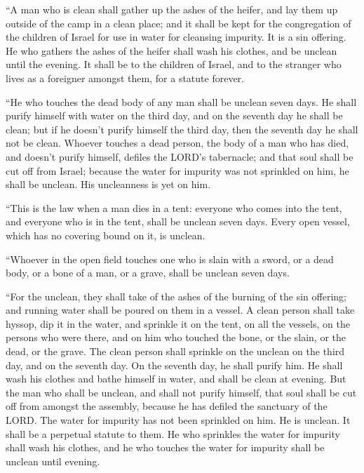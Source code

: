  ``A man who is clean shall gather up the ashes of the
heifer, and lay them up outside of the camp in a clean place; and it
shall be kept for the congregation of the children of Israel for use in
water for cleansing impurity. It is a sin offering.  He
who gathers the ashes of the heifer shall wash his clothes, and be
unclean until the evening. It shall be to the children of Israel, and to
the stranger who lives as a foreigner amongst them, for a statute
forever.

 ``He who touches the dead body of any man shall be
unclean seven days.  He shall purify himself with water
on the third day, and on the seventh day he shall be clean; but if he
doesn't purify himself the third day, then the seventh day he shall not
be clean.  Whoever touches a dead person, the body of a
man who has died, and doesn't purify himself, defiles the LORD's
tabernacle; and that soul shall be cut off from Israel; because the
water for impurity was not sprinkled on him, he shall be unclean. His
uncleanness is yet on him.

 ``This is the law when a man dies in a tent: everyone
who comes into the tent, and everyone who is in the tent, shall be
unclean seven days.  Every open vessel, which has no
covering bound on it, is unclean.

 ``Whoever in the open field touches one who is slain
with a sword, or a dead body, or a bone of a man, or a grave, shall be
unclean seven days.

 ``For the unclean, they shall take of the ashes of the
burning of the sin offering; and running water shall be poured on them
in a vessel.  A clean person shall take hyssop, dip it in
the water, and sprinkle it on the tent, on all the vessels, on the
persons who were there, and on him who touched the bone, or the slain,
or the dead, or the grave.  The clean person shall
sprinkle on the unclean on the third day, and on the seventh day. On the
seventh day, he shall purify him. He shall wash his clothes and bathe
himself in water, and shall be clean at evening.  But the
man who shall be unclean, and shall not purify himself, that soul shall
be cut off from amongst the assembly, because he has defiled the
sanctuary of the LORD. The water for impurity has not been sprinkled on
him. He is unclean.  It shall be a perpetual statute to
them. He who sprinkles the water for impurity shall wash his clothes,
and he who touches the water for impurity shall be unclean until
evening.

